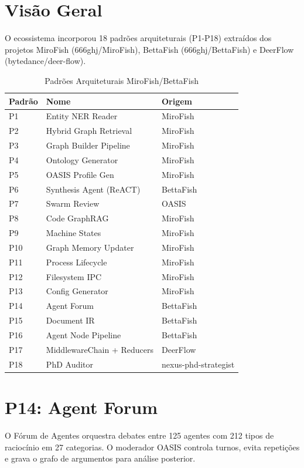 \documentclass[12pt,a4paper,sumario=tradicional]{abntex2}
\begin{document}
\section{Visão Geral}

O ecossistema incorporou 18 padrões arquiteturais (P1-P18) extraídos dos projetos MiroFish (666ghj/MiroFish), BettaFish (666ghj/BettaFish) e DeerFlow (bytedance/deer-flow).

\begin{longtable}{@{}lll@{}}
\caption{Padrões Arquiteturais MiroFish/BettaFish}\\
\toprule
\textbf{Padrão} & \textbf{Nome} & \textbf{Origem} \\
\midrule
P1 & Entity NER Reader & MiroFish \\
P2 & Hybrid Graph Retrieval & MiroFish \\
P3 & Graph Builder Pipeline & MiroFish \\
P4 & Ontology Generator & MiroFish \\
P5 & OASIS Profile Gen & MiroFish \\
P6 & Synthesis Agent (ReACT) & BettaFish \\
P7 & Swarm Review & OASIS \\
P8 & Code GraphRAG & MiroFish \\
P9 & Machine States & MiroFish \\
P10 & Graph Memory Updater & MiroFish \\
P11 & Process Lifecycle & MiroFish \\
P12 & Filesystem IPC & MiroFish \\
P13 & Config Generator & MiroFish \\
P14 & Agent Forum & BettaFish \\
P15 & Document IR & BettaFish \\
P16 & Agent Node Pipeline & BettaFish \\
P17 & MiddlewareChain + Reducers & DeerFlow \\
P18 & PhD Auditor & nexus-phd-strategist \\
\bottomrule
\end{longtable}

\section{P14: Agent Forum}

O Fórum de Agentes orquestra debates entre 125 agentes com 212 tipos de raciocínio em 27 categorias. O moderador OASIS controla turnos, evita repetições e grava o grafo de argumentos para análise posterior.
\end{document}
